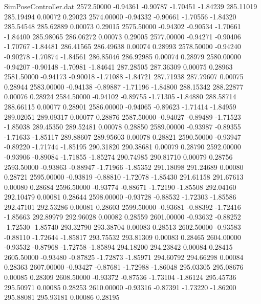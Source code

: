 \begin{filecontents}{SimPoseController.dat}
2572.50000   -0.94361   -0.90787    -1.70451   -1.84239  285.11019  285.19494    0.00072    0.29023
2574.00000   -0.94332   -0.90661    -1.70556   -1.84320  285.54548  285.62889    0.00073    0.29015
2575.50000   -0.94302   -0.90534    -1.70661   -1.84400  285.98065  286.06272    0.00073    0.29005
2577.00000   -0.94271   -0.90406    -1.70767   -1.84481  286.41565  286.49638    0.00074    0.28993
2578.50000   -0.94240   -0.90278    -1.70874   -1.84561  286.85046  286.92985    0.00074    0.28979
2580.00000   -0.94207   -0.90148    -1.70981   -1.84641  287.28505  287.36309    0.00075    0.28963
2581.50000   -0.94173   -0.90018    -1.71088   -1.84721  287.71938  287.79607    0.00075    0.28944
2583.00000   -0.94138   -0.89887    -1.71196   -1.84800  288.15342  288.22877    0.00076    0.28924
2584.50000   -0.94102   -0.89755    -1.71305   -1.84880  288.58714  288.66115    0.00077    0.28901
2586.00000   -0.94065   -0.89623    -1.71414   -1.84959  289.02051  289.09317    0.00077    0.28876
2587.50000   -0.94027   -0.89489    -1.71523   -1.85038  289.45350  289.52481    0.00078    0.28850
2589.00000   -0.93987   -0.89355    -1.71633   -1.85117  289.88607  289.95603    0.00078    0.28821
2590.50000   -0.93947   -0.89220    -1.71744   -1.85195  290.31820  290.38681    0.00079    0.28790
2592.00000   -0.93906   -0.89084    -1.71855   -1.85274  290.74985  290.81710    0.00079    0.28756
2593.50000   -0.93863   -0.88947    -1.71966   -1.85352  291.18098  291.24689    0.00080    0.28721
2595.00000   -0.93819   -0.88810    -1.72078   -1.85430  291.61158  291.67613    0.00080    0.28684
2596.50000   -0.93774   -0.88671    -1.72190   -1.85508  292.04160  292.10479    0.00081    0.28644
2598.00000   -0.93728   -0.88532    -1.72303   -1.85586  292.47101  292.53286    0.00081    0.28603
2599.50000   -0.93681   -0.88392    -1.72416   -1.85663  292.89979  292.96028    0.00082    0.28559
2601.00000   -0.93632   -0.88252    -1.72530   -1.85740  293.32790  293.38704    0.00083    0.28513
2602.50000   -0.93583   -0.88110    -1.72644   -1.85817  293.75532  293.81309    0.00083    0.28465
2604.00000   -0.93532   -0.87968    -1.72758   -1.85894  294.18200  294.23842    0.00084    0.28415
2605.50000   -0.93480   -0.87825    -1.72873   -1.85971  294.60792  294.66298    0.00084    0.28363
2607.00000   -0.93427   -0.87681    -1.72988   -1.86048  295.03305  295.08676    0.00085    0.28309
2608.50000   -0.93372   -0.87536    -1.73104   -1.86124  295.45736  295.50971    0.00085    0.28253
2610.00000   -0.93316   -0.87391    -1.73220   -1.86200  295.88081  295.93181    0.00086    0.28195

\end{filecontents}
